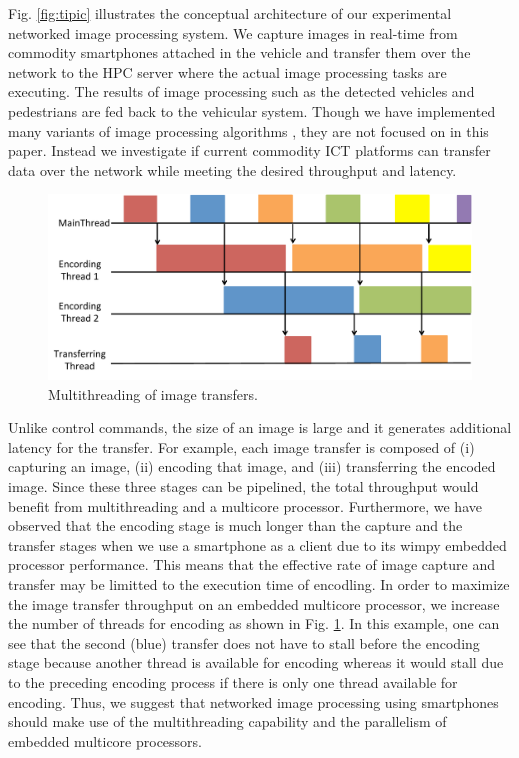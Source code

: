 Fig. \ref{fig:tipic} illustrates the conceptual architecture of our
experimental networked image processing system.
We capture images in real-time from commodity smartphones attached in
the vehicle and transfer them over the network to the HPC server where
the actual image processing tasks are executing.
The results of image processing such as the detected vehicles and
pedestrians are fed back to the vehicular system.
Though we have implemented many variants of image processing algorithms
\cite{Hirabayashi13}, they are not focused on in this paper.
Instead we investigate if current commodity ICT platforms can transfer
data over the network while meeting the desired throughput and latency.

\begin{figure}[!t]
 \centering
 \includegraphics[width=\hsize]{fig/multithread.pdf}
 \caption{Multithreading of image transfers.}
 \label{fig:multithread}
\end{figure}

Unlike control commands, the size of an image is large and it generates
additional latency for the transfer.
For example, each image transfer is composed of (i) capturing an image,
(ii) encoding that image, and (iii) transferring the encoded image.
Since these three stages can be pipelined, the total throughput would
benefit from multithreading and a multicore processor.
Furthermore, we have observed that the encoding stage is much longer
than the capture and the transfer stages when we use a smartphone as a
client due to its wimpy embedded processor performance.
This means that the effective rate of image capture and transfer may be
limitted to the execution time of encodling.
In order to maximize the image transfer throughput on an embedded
multicore processor, we increase the number of threads for encoding as
shown in Fig. \ref{fig:multithread}.
In this example, one can see that the second (blue) transfer does not
have to stall before the encoding stage because another thread is
available for encoding whereas it would stall due to the preceding
encoding process if there is only one thread available for encoding.
Thus, we suggest that networked image processing using smartphones
should make use of the multithreading capability and the parallelism of
embedded multicore processors.